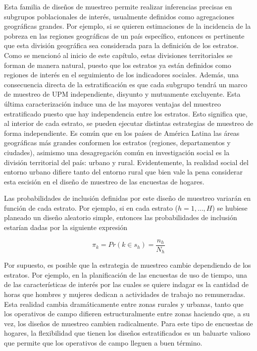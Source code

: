 Esta familia de diseños de muestreo permite realizar inferencias precisas en subgrupos poblacionales de interés, usualmente definidos como agregaciones geográficas grandes. Por ejemplo, si se quieren estimaciones de la incidencia de la pobreza en las regiones geográficas de un país específico, entonces es pertinente que esta división geográfica sea considerada para la definición de los estratos. Como se mencionó al inicio de este capítulo, estas divisiones territoriales se forman de manera natural, puesto que los estratos ya están definidos como regiones de interés en el seguimiento de los indicadores sociales. Además, una consecuencia directa de la estratificación es que cada subgrupo tendrá un marco de muestreo de UPM independiente, disyunto y mutuamente excluyente. Esta última caracterización induce una de las mayores ventajas del muestreo estratificado puesto que hay independencia entre los estratos. Esto significa que, al interior de cada estrato, se pueden ejecutar distintas estrategias de muestreo de forma independiente. Es común que en los países de América Latina las áreas geográficas más grandes conformen los estratos (regiones, departamentos y ciudades), asimismo una desagregación común en investigación social es la división territorial del país: urbano y rural. Evidentemente, la realidad social del entorno urbano difiere tanto del entorno rural que bien vale la pena considerar esta escisión en el diseño de muestreo de las encuestas de hogares.

Las probabilidades de inclusión definidas por este diseño de muestreo variarán en función de cada estrato. Por ejemplo, si en cada estrato (\(h=1, \ldots, H\)) se hubiese planeado un diseño aleatorio simple, entonces las probabilidades de inclusión estarían dadas por la siguiente expresión

\[\pi_k = Pr(k \in s_h) = \frac{n_h}{N_h}\]

Por supuesto, es posible que la estrategia de muestreo cambie dependiendo de los estratos. Por ejemplo, en la planificación de las encuestas de uso de tiempo, una de las características de interés por las cuales se quiere indagar es la cantidad de horas que hombres y mujeres dedican a actividades de trabajo no remuneradas. Esta realidad cambia dramáticamente entre zonas rurales y urbanas, tanto que los operativos de campo difieren estructuralmente entre zonas haciendo que, a su vez, los diseños de muestreo cambien radicalmente. Para este tipo de encuestas de hogares, la flexibilidad que tienen los diseños estratificados es un baluarte valioso que permite que los operativos de campo lleguen a buen término.

